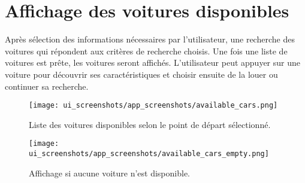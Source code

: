 \section{Affichage des voitures disponibles}
Après sélection des informations nécessaires par l'utilisateur, une recherche des voitures qui répondent aux critères de recherche choisis. Une fois une liste de voitures est prête, les voitures seront affichés. L'utilisateur peut appuyer sur une voiture pour découvrir ses caractéristiques et choisir ensuite de la louer ou continuer sa recherche.
\begin{multicols}{2}
    \begin{figure}[H]
        \centering
        \texttt{[image: ui\_screenshots/app\_screenshots/available\_cars.png]}
        \captionsetup{justification=centering}
        \caption{Liste des voitures disponibles selon le point de départ sélectionné.}
        \label{fig:app_available_cars}
    \end{figure}
    \begin{figure}[H]
        \centering
        \texttt{[image: ui\_screenshots/app\_screenshots/available\_cars\_empty.png]}
        \captionsetup{justification=centering}
        \caption{Affichage si aucune voiture n'est disponible.}
        \label{fig:app_available_cars_empty}
    \end{figure}
\end{multicols}
